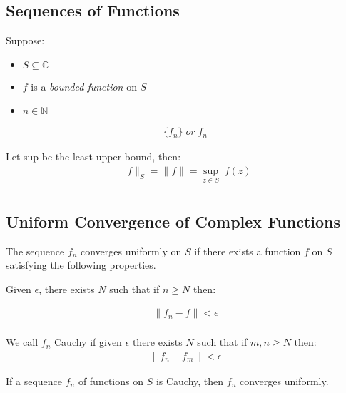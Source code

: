 \subsection{Sequences of Functions}
Suppose:
\begin{itemize}
  \item $S \subseteq \mathbb{C}$
  \item $f$ is a \emph{bounded function} on $S$
  \item $n \in \mathbb{N}$
\end{itemize}

\begin{defn}
  \begin{align*}
    \{ f_n \} \; or \; f_n 
  \end{align*}
\end{defn}

\begin{defn}
  Let sup be the least upper bound, then:
  \begin{align*}
    \| f \|_S = \| f \| = \sup_{z \in S} | f(z) | \\
  \end{align*}
\end{defn}

\subsection{Uniform Convergence of Complex Functions}

\begin{defn}
  The sequence $ f_n $ converges uniformly on $S$ if there exists a 
  function $f$ on $S$ satisfying the following properties.

  Given $\epsilon$, there exists $N$ such that if $n \geq N$ then:

  \begin{align*}
    \| f_n - f \| < \epsilon \\
  \end{align*}
\end{defn}

\begin{defn}
  We call $f_n$ Cauchy if given $\epsilon$ there exists $N$ such that if $m, n \geq N$ then:
  \begin{align*}
    \| f_n - f_m \| < \epsilon
  \end{align*}
\end{defn}

\begin{thm}
  If a sequence $f_n$ of functions on $S$ is Cauchy, then $f_n$ converges uniformly.
\end{thm}

